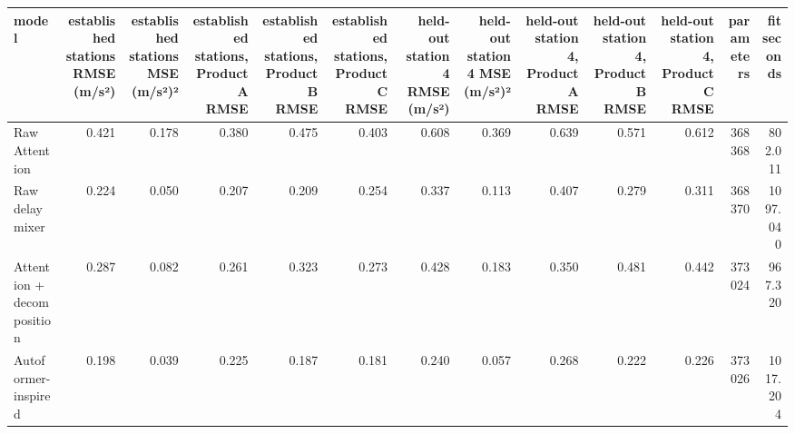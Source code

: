 \begin{tabular}{lrrrrrrrrrrrr}
\toprule
model & established stations RMSE (m/s²) & established stations MSE (m/s²)² & established stations, Product A RMSE & established stations, Product B RMSE & established stations, Product C RMSE & held-out station 4 RMSE (m/s²) & held-out station 4 MSE (m/s²)² & held-out station 4, Product A RMSE & held-out station 4, Product B RMSE & held-out station 4, Product C RMSE & parameters & fit seconds \\
\midrule
Raw Attention & 0.421 & 0.178 & 0.380 & 0.475 & 0.403 & 0.608 & 0.369 & 0.639 & 0.571 & 0.612 & 368368 & 802.011 \\
Raw delay mixer & 0.224 & 0.050 & 0.207 & 0.209 & 0.254 & 0.337 & 0.113 & 0.407 & 0.279 & 0.311 & 368370 & 1097.040 \\
Attention + decomposition & 0.287 & 0.082 & 0.261 & 0.323 & 0.273 & 0.428 & 0.183 & 0.350 & 0.481 & 0.442 & 373024 & 967.320 \\
Autoformer-inspired & 0.198 & 0.039 & 0.225 & 0.187 & 0.181 & 0.240 & 0.057 & 0.268 & 0.222 & 0.226 & 373026 & 1017.204 \\
\bottomrule
\end{tabular}
